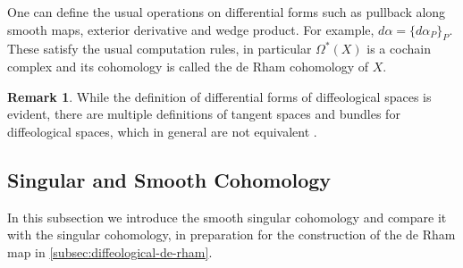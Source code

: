 \documentclass{scrartcl}
\theoremstyle{plain}
\theoremstyle{definition}
\newtheorem{remark}[theorem]{Remark}
\begin{document}
One can define the usual operations on differential forms such as pullback along smooth maps, exterior derivative and wedge product. For example, $d\alpha = \{d\alpha_P\}_P$. These satisfy the usual computation rules, in particular $\Omega^*(X)$ is a cochain complex and its cohomology is called the de Rham cohomology of $X$. 

\begin{remark}
    While the definition of differential forms of diffeological spaces is evident, there are multiple definitions of tangent spaces and bundles for diffeological spaces, which in general are not equivalent \cite{christensen2015tangent}.
\end{remark}



\subsection{Singular and Smooth Cohomology} \label{subsec:diffeology-cohomology}

In this subsection we introduce the smooth singular cohomology and compare it with the singular cohomology, in preparation for the construction of the de Rham map in \cref{subsec:diffeological-de-rham}. 
\end{document}
